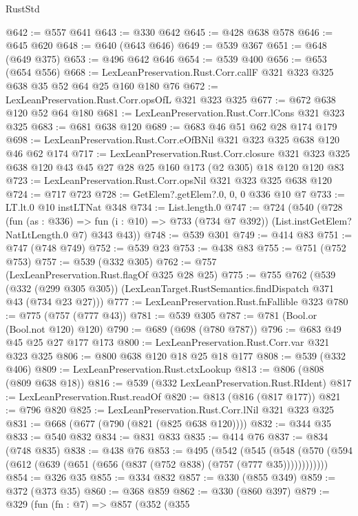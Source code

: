 \begin{lexlean}{RustStd}
\begin{coremodule}
@642 := @557 @641
@643 := @330 @642
@645 := @428 @638 @578
@646 := @645 @620
@648 := @640 (@643 @646)
@649 := @539 @367
@651 := @648 (@649 @375)
@653 := @496 @642 @646
@654 := @539 @400
@656 := @653 (@654 @556)
@668 := LexLeanPreservation.Rust.Corr.callF @321 @323 @325 @638 @35 @52 @64 @25 @160 @180 @76
@672 := LexLeanPreservation.Rust.Corr.opsOfL @321 @323 @325
@677 := @672 @638 @120 @52 @64 @180
@681 := LexLeanPreservation.Rust.Corr.lCons @321 @323 @325
@683 := @681 @638 @120
@689 := @683 @46 @51 @62 @28 @174 @179
@698 := LexLeanPreservation.Rust.Corr.eOfBNil @321 @323 @325 @638 @120 @46 @62 @174
@717 := LexLeanPreservation.Rust.Corr.closure
    @321
    @323
    @325
    @638
    @120
    @43
    @45
    @27
    @28
    @25
    @160
    @173
    (@2 @305)
    @18
    @120
    @120
    @83
@723 := LexLeanPreservation.Rust.Corr.opsNil @321 @323 @325 @638 @120
@724 := @717 @723
@728 := GetElem?.getElem?.{0, 0, 0} @336 @10 @7
@733 := LT.lt.{0} @10 instLTNat @348
@734 := List.length.{0}
@747 := @724
    (@540
      (@728
        (fun (as : @336) => fun (i : @10) => @733 (@734 @7 @392))
        (List.instGetElem?NatLtLength.{0} @7)
        @343
        @43))
@748 := @539 @301
@749 := @414 @83
@751 := @747 (@748 @749)
@752 := @539 @23
@753 := @438 @83
@755 := @751 (@752 @753)
@757 := @539 (@332 @305)
@762 := @757 (LexLeanPreservation.Rust.flagOf @325 @28 @25)
@775 := @755
    @762
    (@539
      (@332 (@299 @305 @305))
      (LexLeanTarget.RustSemantics.findDispatch @371 @43 (@734 @23 @27)))
@777 := LexLeanPreservation.Rust.fnFallible @323
@780 := @775 (@757 (@777 @43))
@781 := @539 @305
@787 := @781 (Bool.or (Bool.not @120) @120)
@790 := @689 (@698 (@780 @787))
@796 := @683 @49 @45 @25 @27 @177 @173
@800 := LexLeanPreservation.Rust.Corr.var @321 @323 @325
@806 := @800 @638 @120 @18 @25 @18 @177
@808 := @539 (@332 @406)
@809 := LexLeanPreservation.Rust.ctxLookup
@813 := @806 (@808 (@809 @638 @18))
@816 := @539 (@332 LexLeanPreservation.Rust.RIdent)
@817 := LexLeanPreservation.Rust.readOf
@820 := @813 (@816 (@817 @177))
@821 := @796 @820
@825 := LexLeanPreservation.Rust.Corr.lNil @321 @323 @325
@831 := @668 (@677 (@790 (@821 (@825 @638 @120))))
@832 := @344 @35
@833 := @540 @832
@834 := @831 @833
@835 := @414 @76
@837 := @834 (@748 @835)
@838 := @438 @76
@853 := @495
    (@542
      (@545 (@548 (@570 (@594 (@612 (@639 (@651 (@656 (@837 (@752 @838) (@757 (@777 @35))))))))))))
@854 := @326 @35
@855 := @334 @832
@857 := @330 (@855 @349)
@859 := @372 (@373 @35)
@860 := @368 @859
@862 := @330 (@860 @397)
@879 := @329
    (fun (fn : @7) =>
    @857
      (@352
        (@355

\end{coremodule}
\end{lexlean}
